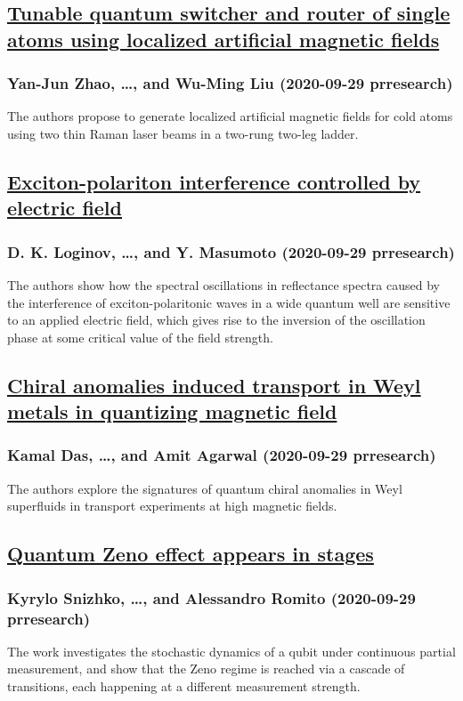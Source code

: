 \subsection*{\href{http://link.aps.org/doi/10.1103/PhysRevResearch.2.033484}{Tunable quantum switcher and router of single atoms using localized artificial magnetic fields}}
\subsubsection*{Yan-Jun Zhao, \dots, and Wu-Ming Liu (2020-09-29 prresearch)}
The authors propose to generate localized artificial magnetic fields for cold atoms using two thin Raman laser beams in a two-rung two-leg ladder.
\subsection*{\href{http://link.aps.org/doi/10.1103/PhysRevResearch.2.033510}{Exciton-polariton interference controlled by electric field}}
\subsubsection*{D. K. Loginov, \dots, and Y. Masumoto (2020-09-29 prresearch)}
The authors show how the spectral oscillations in reflectance spectra caused by the interference of exciton-polaritonic waves in a wide quantum well are sensitive to an applied electric field, which gives rise to the inversion of the oscillation phase at some critical value of the field strength.
\subsection*{\href{http://link.aps.org/doi/10.1103/PhysRevResearch.2.033511}{Chiral anomalies induced transport in Weyl metals in quantizing magnetic field}}
\subsubsection*{Kamal Das, \dots, and Amit Agarwal (2020-09-29 prresearch)}
The authors explore the signatures of quantum chiral anomalies in Weyl superfluids in transport experiments at high magnetic fields.
\subsection*{\href{http://link.aps.org/doi/10.1103/PhysRevResearch.2.033512}{Quantum Zeno effect appears in stages}}
\subsubsection*{Kyrylo Snizhko, \dots, and Alessandro Romito (2020-09-29 prresearch)}
The work investigates the stochastic dynamics of a qubit under continuous partial measurement, and show that the Zeno regime is reached via a cascade of transitions, each happening at a different measurement strength.
